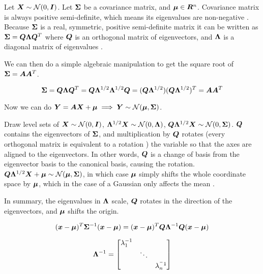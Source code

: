 Let ${\bm{X}} \sim {\mathcal{N}}(0, {\bm{I}})$. Let ${\bm{\Sigma}}$ be a covariance matrix, and ${\bm{\mu}} \in {\bm{R}}^n$. Covariance matrix is always positive semi-definite, which means its eigenvalues are non-negative . Because ${\bm{\Sigma}}$ is a real, symmetric, positive semi-definite matrix it can be written as ${\bm{\Sigma}} = {\bm{Q}} {\bm{\Lambda}} {\bm{Q}}^T$ where ${\bm{Q}}$ is an orthogonal matrix of eigenvectors, and ${\bm{\Lambda}}$ is a diagonal matrix of eigenvalues .

We can then do a simple algebraic manipulation to get the square root of ${\bm{\Sigma}} = {\bm{A}} {\bm{A}}^T$. 

\begin{equation}
    {\bm{\Sigma}} = {\bm{Q}} {\bm{\Lambda}} {\bm{Q}}^T = {\bm{Q}} {\bm{\Lambda}}^{1/2} {\bm{\Lambda}}^{1/2} {\bm{Q}} = ({\bm{Q}} {\bm{\Lambda}}^{1/2}) ({\bm{Q}} {\bm{\Lambda}}^{1/2})^T = {\bm{A}} {\bm{A}}^T
\end{equation}

Now we can do ${\bm{Y}} = {\bm{A}} {\bm{X}} + {\bm{\mu}} \implies {\bm{Y}} \sim {\mathcal{N}}({\bm{\mu}}, {\bm{\Sigma}})$.

Draw level sets of ${\bm{X}} \sim {\mathcal{N}}(0, {\bm{I}})$, ${\bm{\Lambda}}^{1/2} {\bm{X}} \sim {\mathcal{N}}(0, {\bm{\Lambda}})$, ${\bm{Q}} {\bm{\Lambda}}^{1/2} {\bm{X}} \sim {\mathcal{N}}(0, {\bm{\Sigma}})$. ${\bm{Q}}$ contains the eigenvectors of ${\bm{\Sigma}}$, and multiplication by ${\bm{Q}}$ rotates (every orthogonal matrix is equivalent to a rotation ) the variable so that the axes are aligned to the eigenvectors. In other words, ${\bm{Q}}$ is a change of basis from the eigenvector basis to the canonical basis, causing the rotation. ${\bm{Q}} {\bm{\Lambda}}^{1/2} {\bm{X}} + {\bm{\mu}} \sim {\mathcal{N}}({\bm{\mu}}, {\bm{\Sigma}})$, in which case ${\bm{\mu}}$ simply shifts the whole coordinate space by ${\bm{\mu}}$, which in the case of a Gaussian only affects the mean .

In summary, the eigenvalues in ${\bm{\Lambda}}$ scale, ${\bm{Q}}$ rotates in the direction of the eigenvectors, and ${\bm{\mu}}$ shifts the origin.

\begin{equation}
    ({\bm{x}} - {\bm{\mu}})^T {\bm{\Sigma}}^{-1} ({\bm{x}} - {\bm{\mu}}) = ({\bm{x}} - {\bm{\mu}})^T {\bm{Q}} {\bm{\Lambda}}^{-1} {\bm{Q}} ({\bm{x}} - {\bm{\mu}})
\end{equation}

\begin{equation}
    {\bm{\Lambda}}^{-1} = \begin{bmatrix}
        \lambda_1^{-1} & & \\
        & \ddots & \\
        & & \lambda_n^{^-1}
    \end{bmatrix}
\end{equation}

